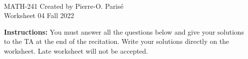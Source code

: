 \documentclass[addpoints, 12pt]{exam}%
\theoremstyle{definition}
\begin{document}
	\noindent \hrulefill \\
	MATH-241 \hfill Created by Pierre-O. Paris{\'e}\\
	Worksheet 04 \hfill Fall 2022\\\vspace*{-0.7cm}
	
	\noindent\hrulefill
	
\vspace*{0.5cm}

\noindent{}

\vspace*{0.25cm}
\begin{center}
\gradetable[h][questions]
\end{center}
\vspace*{0.25cm}

{\bf Instructions:} You must answer all the questions below and give your solutions to the TA at the end of the recitation. Write your solutions directly on the worksheet. Late worksheet will not be accepted.


\vspace*{0.5cm}
\end{document}
